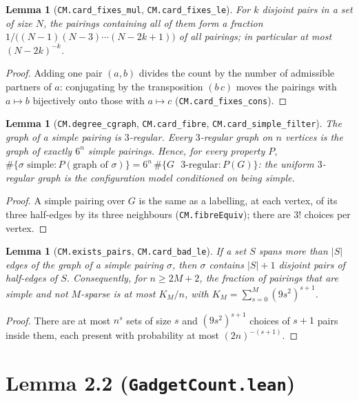 \documentclass[11pt]{amsart}
\newcommand{\leanname}[1]{\texttt{\textcolor{black!75}{#1}}}
\newcommand{\lfile}[1]{\texttt{#1}}
\theoremstyle{plain}
\newtheorem{lemma}[theorem]{Lemma}
\theoremstyle{definition}
\theoremstyle{remark}
\begin{document}
\begin{lemma}[\leanname{CM.card\_fixes\_mul}, \leanname{CM.card\_fixes\_le}]
For $k$ disjoint pairs in a set of size $N$, the pairings containing all of them form a fraction
$1/\bigl((N-1)(N-3)\cdots(N-2k+1)\bigr)$ of all pairings; in particular at most $(N-2k)^{-k}$.
\end{lemma}
\begin{proof}
Adding one pair $(a,b)$ divides the count by the number of admissible partners of $a$:
conjugating by the transposition $(b\,c)$ moves the pairings with $a\mapsto b$ bijectively onto
those with $a\mapsto c$ (\leanname{CM.card\_fixes\_cons}).
\end{proof}

\begin{lemma}[\leanname{CM.degree\_cgraph}, \leanname{CM.card\_fibre}, \leanname{CM.card\_simple\_filter}]
The graph of a simple pairing is $3$-regular. Every $3$-regular graph on $n$ vertices is the graph
of exactly $6^n$ simple pairings. Hence, for every property $P$,
$\#\{\sigma\text{ simple}:P(\text{graph of }\sigma)\}=6^n\,\#\{G\text{ $3$-regular}:P(G)\}$: the
uniform $3$-regular graph is the configuration model conditioned on being simple.
\end{lemma}
\begin{proof}
A simple pairing over $G$ is the same as a labelling, at each vertex, of its three half-edges by
its three neighbours (\leanname{CM.fibreEquiv}); there are $3!$ choices per vertex.
\end{proof}

\begin{lemma}[\leanname{CM.exists\_pairs}, \leanname{CM.card\_bad\_le}]
If a set $S$ spans more than $|S|$ edges of the graph of a simple pairing $\sigma$, then $\sigma$
contains $|S|+1$ disjoint pairs of half-edges of $S$. Consequently, for $n\ge2M+2$, the fraction
of pairings that are simple and not $M$-sparse is at most $K_M/n$, with
$K_M=\sum_{s=0}^M(9s^2)^{s+1}$.
\end{lemma}
\begin{proof}
There are at most $n^s$ sets of size $s$ and $(9s^2)^{s+1}$ choices of $s+1$ pairs inside them,
each present with probability at most $(2n)^{-(s+1)}$.
\end{proof}

\section{Lemma 2.2 (\lfile{GadgetCount.lean})}
\end{document}
